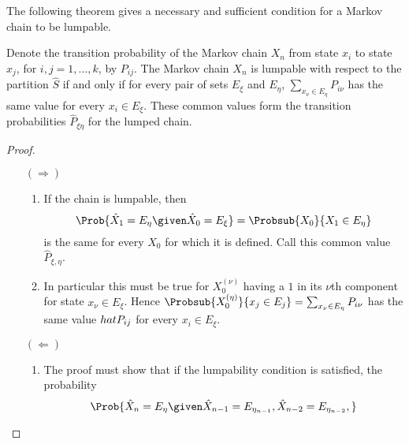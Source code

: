 \documentclass[12pt]{article}
\begin{document}
The following theorem gives a necessary and sufficient condition for a
Markov chain to be lumpable.

\begin{theorem}
    Denote the transition probability of the Markov chain \( X_n \) from
    state \( x_i \) to state \( x_j \), for \( i, j = 1, \dots, k \), by
    \( P_{ij} \).  The Markov chain \( X_n \) is lumpable with respect
    to the partition \( \hat{S} \) if and only if for every pair of sets
    \( E_{\xi} \) and \( E_{\eta} \), \( \sum_{x_{\nu} \in E_{\eta}} P_{i\nu}
    \) has the same value for every \( x_i \in E_{\xi} \).  These common
    values form the transition probabilities \( \hat{P}_{\xi \eta} \)
    for the lumped chain.
\end{theorem}

\begin{proof}
    \begin{enumerate}
        \item[\( (\Rightarrow) \)]
            \begin{enumerate}
                \item
                    If the chain is lumpable, then
                    \[
                        \Prob{\hat{X}_1 = E_{\eta} \given \hat{X}_0 = E_
                        {\xi}} = \Probsub{X_0}{X_1 \in E_{\eta} }
                    \] is the same for every \( X_0 \) for which it is
                    defined.  Call this common value \( \hat{P}_{\xi,\eta}
                    \).
                \item
                    In particular this must be true for \( X_0^{(\nu)} \)
                    having a \( 1 \) in its \( \nu \)th component for
                    state \( x_{\nu} \in E_{\xi} \).  Hence \( \Probsub{X_0^
                    {(\eta)}}{x_{j} \in E_j} = \sum_{x_\nu \in E_{\eta}}
                    P_{i \nu } \) has the same value \( \\
                    hat{P}_{ij} \) for every \( x_i \in E_{\xi} \).
            \end{enumerate}
        \item[\( (\Leftarrow) \)]
            \begin{enumerate}
                \item
                    The proof must show that if the lumpability
                    condition is satisfied, the probability
                    \[
                        \Prob{\hat{X}_n = E_\eta \given \hat{X}_{n-1} =
                        E_{\eta_ {n-1}}, \hat{X}_{n-2} = E_{\eta_{n-2}},
}\]
\end{enumerate}
\end{enumerate}
\end{proof}
\end{document}
